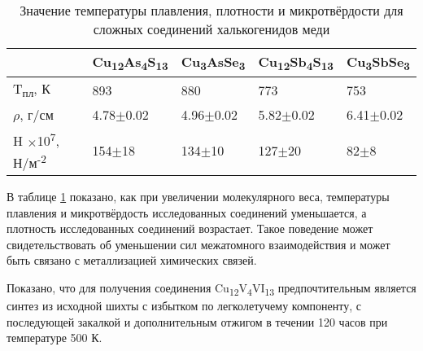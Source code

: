 \begin{table} [htbp]%
    \centering
	\caption{Значение температуры плавления, плотности и микротвёрдости для сложных соединений халькогенидов меди}%
	\label{hard}%
    \renewcommand{\arraystretch}{1.5}
	\begin{tabular}{@{}@{\extracolsep{20pt}}lllll@{}}
        \toprule     %
    	 & Cu\textsubscript{12}As\textsubscript{4}S\textsubscript{13} &Cu\textsubscript{3}AsSe\textsubscript{3}& Cu\textsubscript{12}Sb\textsubscript{4}S\textsubscript{13} &Cu\textsubscript{3}SbSe\textsubscript{3}	\\
        \midrule
    T\textsubscript{пл}, К & 893 & 880												& 773& 753	\\ \hline
    	$ \rho$, г/см 	&  4.78$\pm$0.02	 						& 4.96$\pm$0.02												&5.82$\pm$0.02 	& 6.41$\pm$0.02 \\ \hline
    	H $\times$10\textsuperscript{7}, Н/м\textsuperscript{-2} 	& 154$\pm$18	 						& 134$\pm$10 	& 127$\pm$20			& 82$\pm$8	\\ \hline

        \bottomrule
	\end{tabular}%
\end{table}
В таблице \ref{hard} показано, как при увеличении молекулярного веса, температуры плавления и микротвёрдость исследованных соединений уменьшается, а плотность исследованных соединений возрастает. Такое поведение может свидетельствовать об уменьшении сил межатомного взаимодействия и может быть связано с металлизацией химических
связей.

Показано, что для получения соединения Cu\textsubscript{12}V\textsubscript{4}VI\textsubscript{13} предпочтительным является синтез из
исходной шихты с избытком по легколетучему компоненту, с последующей закалкой и
дополнительным отжигом в течении 120 часов при температуре 500 К.
\clearpage

\newpage
